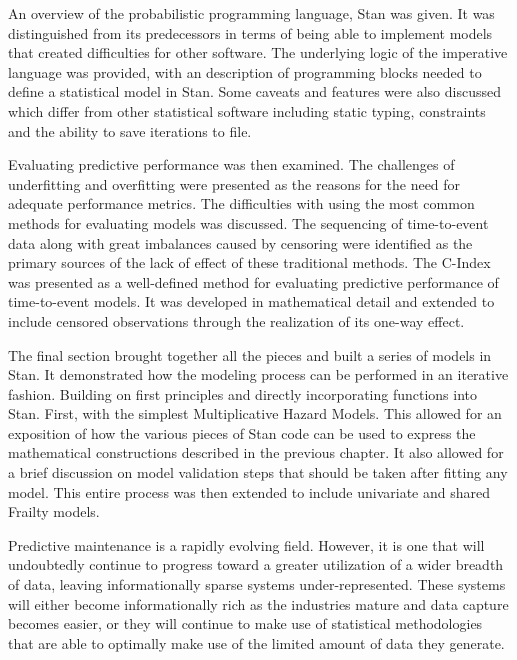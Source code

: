 An overview of the probabilistic programming language, Stan was given. It was distinguished from its predecessors in terms of being able to implement models that created difficulties for other software. The underlying logic of the imperative  language was provided, with an description of programming blocks needed to define a statistical model in Stan. Some caveats and features were also discussed which differ from other statistical software including static typing, constraints and the ability to save iterations to file.

Evaluating predictive performance was then examined. The challenges of underfitting and overfitting were presented as the reasons for the need for adequate performance metrics. The difficulties with using the most common methods for evaluating models was discussed. The sequencing of time-to-event data along with great imbalances caused by censoring were identified as the primary sources of the lack of effect of these traditional methods. The C-Index was presented as a well-defined method for evaluating predictive performance of time-to-event models. It was developed in mathematical detail and extended to include censored observations through the realization of its one-way effect.

The final section brought together all the pieces and built a series of models in Stan. It demonstrated how the modeling process can be performed in an iterative fashion. Building on first principles and directly incorporating functions into Stan. First, with the simplest Multiplicative Hazard Models. This allowed for an exposition of how the various pieces of Stan code can be used to express the mathematical constructions described in the previous chapter. It also allowed for a brief discussion on model validation steps that should be taken after fitting any model. This entire process was then extended to include univariate and shared Frailty models. 

Predictive maintenance is a rapidly evolving field. However, it is one that will undoubtedly continue to progress toward a greater utilization of a wider breadth of data, leaving informationally sparse systems under-represented. These systems will either become informationally rich as the industries mature and data capture becomes easier, or they will continue to make use of statistical methodologies that are able to optimally make use of the limited amount of data they generate.






